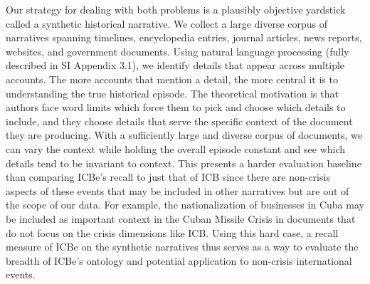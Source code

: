 \documentclass{article}
\begin{document}
Our strategy for dealing with both problems is a plausibly objective
yardstick called a synthetic historical narrative. We collect a large
diverse corpus of narratives spanning timelines, encyclopedia entries,
journal articles, news reports, websites, and government documents.
Using natural language processing (fully described in SI Appendix 3.1),
we identify details that appear across multiple accounts. The more
accounts that mention a detail, the more central it is to understanding
the true historical episode. The theoretical motivation is that authors
face word limits which force them to pick and choose which details to
include, and they choose details that serve the specific context of the
document they are producing. With a sufficiently large and diverse
corpus of documents, we can vary the context while holding the overall
episode constant and see which details tend to be invariant to context.
This presents a harder evaluation baseline than comparing ICBe's recall
to just that of ICB since there are non-crisis aspects of these events
that may be included in other narratives but are out of the scope of our
data. For example, the nationalization of businesses in Cuba may be
included as important context in the Cuban Missile Crisis in documents
that do not focus on the crisis dimensions like ICB. Using this hard
case, a recall measure of ICBe on the synthetic narratives thus serves
as a way to evaluate the breadth of ICBe's ontology and potential
application to non-crisis international events.
\end{document}
